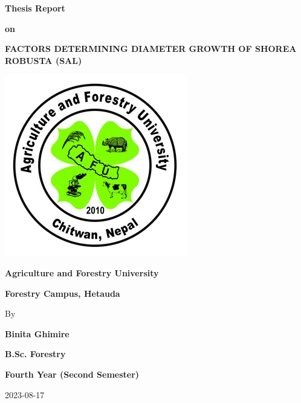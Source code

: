 \documentclass[
]{article}
\author{}
\date{\vspace{-2.5em}}
\begin{document}
\allsectionsfont{\raggedright}
\subsectionfont{\raggedright}
\subsubsectionfont{\raggedright}

\vspace{0cm}


\begin{centering}

\Large

\doublespacing

\bf Thesis Report

\bf on

\bf FACTORS DETERMINING DIAMETER GROWTH OF SHOREA ROBUSTA (SAL)



\begin{center}\includegraphics[width=0.5\linewidth]{AFU_logo} \end{center}


\normalsize

\Large

\bf Agriculture and Forestry University


\bf Forestry Campus, Hetauda

\vspace{1cm}

\normalsize

\singlespacing

By

\vspace{0.5 cm}

\Large

\bf Binita Ghimire

\Large

\bf B.Sc. Forestry

\bf Fourth Year (Second Semester)

\vspace{1cm}

\normalsize

2023-08-17

\end{centering}
\end{document}

